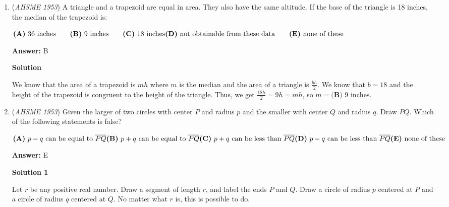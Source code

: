 \begin{enumerate}
Recall that the ratio between the areas of any two similar figures must equal the square of the ratio between their corresponding dimensions.  Thus the ratio between the areas of these two circles is $\left(\frac{8}{12}\right)^2 = \left(\frac{2}{3}\right)^2= \boxed{\textbf{(B) }\frac{4}{9}}$.

 


	\item (\textit{AHSME 1953}) A triangle and a trapezoid are equal in area. They also have the same altitude. If the base of the triangle is 18 inches, the median of the trapezoid is: 


 $\textbf{(A)}\ 36\text{ inches} \qquad \textbf{(B)}\ 9\text{ inches} \qquad \textbf{(C)}\ 18\text{ inches}\\  \textbf{(D)}\ \text{not obtainable from these data}\qquad \textbf{(E)}\ \text{none of these}$

 \textbf{Answer: }B



\textbf{Solution}

We know that the area of a trapezoid is $mh$ where $m$ is the median and the area of a triangle is $\frac{bh}{2}$. We know that $b=18$ and the height of the trapezoid is congruent to the height of the triangle. Thus, we get $\frac{18h}{2}=9h=mh$, so $m=\textbf{(B) }9\text{ inches}$.

 


 


	\item (\textit{AHSME 1953}) Given the larger of two circles with center $P$ and radius $p$ and the smaller with center $Q$ and radius $q$. Draw $PQ$. Which of the following statements is false? 


 $\textbf{(A)}\ p-q\text{ can be equal to }\overline{PQ}\\  \textbf{(B)}\ p+q\text{ can be equal to }\overline{PQ}\\  \textbf{(C)}\ p+q\text{ can be less than }\overline{PQ}\\  \textbf{(D)}\ p-q\text{ can be less than }\overline{PQ}\\ \textbf{(E)}\ \text{none of these}$

 \textbf{Answer: }E



\textbf{Solution 1}

Let $r$ be any positive real number.  Draw a segment of length $r$, and label the ends $P$ and $Q$.  Draw a circle of radius $p$ centered at $P$ and a circle of radius $q$ centered at $Q$.  No matter what $r$ is, this is possible to do.  


\end{enumerate}

